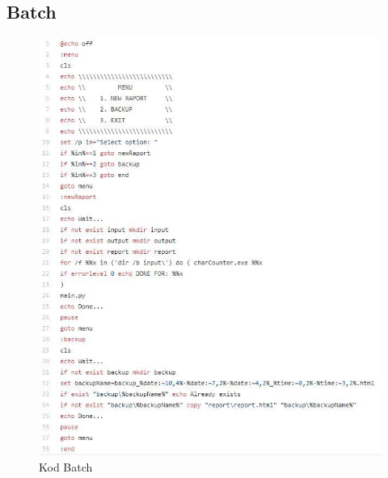 \documentclass[]{article}
\begin{document}
\subsection{Batch}
\begin{figure}[H]
	\centering
	\includegraphics[width=0.9\linewidth]{batch_code}
	\caption{Kod Batch}
	\label{fig:batchcode}
\end{figure}
\end{document}
